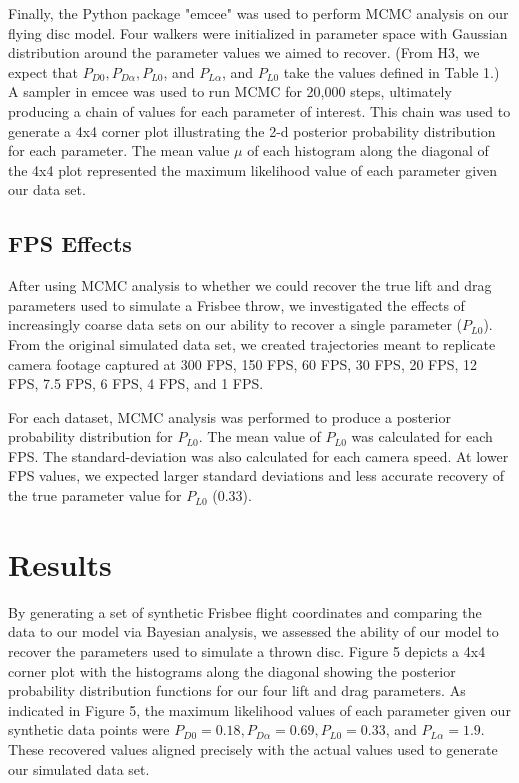 \documentclass[a4paper,12pt, oneside]{article}
\begin{document}
Finally, the Python package "emcee" was used to perform MCMC analysis on our flying disc model. Four walkers were initialized in parameter space with Gaussian distribution around the parameter values we aimed to recover. (From H3, we expect that $P_{D0}, P_{D\alpha}, P_{L0}$, and $P_{L\alpha}$, and $P_{L0}$ take the values defined in Table 1.) A sampler in emcee was used to run MCMC for 20,000 steps, ultimately producing a chain of values for each parameter of interest.  This chain was used to generate a 4x4 corner plot illustrating the 2-d posterior probability distribution for each parameter. The mean value $\mu$ of each histogram along the diagonal of the 4x4 plot represented the maximum likelihood value of each parameter given our data set.

\subsection{FPS Effects}
After using MCMC analysis to whether we could recover the true lift and drag parameters used to simulate a Frisbee throw, we investigated the effects of increasingly coarse data sets on our ability to recover a single parameter ($P_{L0}$). From the original simulated data set, we created trajectories meant to replicate camera footage captured at 300 FPS, 150 FPS, 60 FPS, 30 FPS, 20 FPS, 12 FPS, 7.5 FPS, 6 FPS, 4 FPS, and 1 FPS.

For each dataset, MCMC analysis was performed to produce a posterior probability distribution for $P_{L0}$. The mean value of $P_{L0}$ was calculated for each FPS. The standard-deviation was also calculated for each camera speed. At lower FPS values, we expected larger standard deviations and less accurate recovery of the true parameter value for $P_{L0}$ (0.33).

\section{Results}

By generating a set of synthetic Frisbee flight coordinates and comparing the data to our model via Bayesian analysis, we assessed the ability of our model to recover the parameters used to simulate a thrown disc. Figure 5 depicts a 4x4 corner plot with the histograms along the diagonal showing the posterior probability distribution functions for our four lift and drag parameters. As indicated in Figure 5, the maximum likelihood values of each parameter given our synthetic data points were $P_{D0} = 0.18, P_{D\alpha}=0.69, P_{L0}=0.33$, and $P_{L\alpha}=1.9$. These recovered values aligned precisely with the actual values used to generate our simulated data set.
\end{document}
